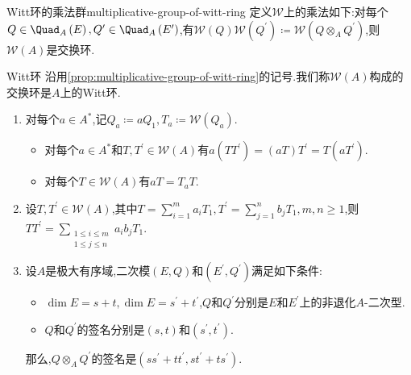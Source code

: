\begin{proposition}{Witt环的乘法群}{multiplicative-group-of-witt-ring}
	定义$\mathcal{W}$上的乘法如下:对每个$Q\in\Quad_{A}\left(E\right),Q^{\prime}\in\Quad_{A}\left(E^{\prime}\right)$,有$\mathcal{W}\left(Q\right)\mathcal{W}\left(Q^{\prime}\right)\coloneq\mathcal{W}\left(Q\otimes_{A}Q^{\prime}\right)$,则$\mathcal{W}\left(A\right)$是交换环.
\end{proposition}

\begin{definition}{Witt环}{}
	沿用\cref{prop:multiplicative-group-of-witt-ring}的记号.我们称$\mathcal{W}\left(A\right)$构成的交换环是$A$上的Witt环.
\end{definition}

\begin{remark}{}{}
	\begin{enumerate}
		\item 对每个$a\in A^{\ast}$,记$Q_{a}\coloneq aQ_{1},T_{a}\coloneq\mathcal{W}\left(Q_{a}\right)$.
		\begin{itemize}
			\item 对每个$a\in A^{\ast}$和$T,T^{\prime}\in\mathcal{W}\left(A\right)$有$a\left(TT^{\prime}\right)=\left(aT\right)T^{\prime}=T\left(aT^{\prime}\right)$.
			\item 对每个$T\in\mathcal{W}\left(A\right)$有$aT=T_{a}T$.
		\end{itemize}
		\item 设$T,T^{\prime}\in\mathcal{W}\left(A\right)$,其中$T=\sum\limits_{i=1}^{m}a_{i}T_{1},T^{\prime}=\sum\limits_{j=1}^{n}b_{j}T_{1},m,n\geq 1$,则$TT^{\prime}=\sum\limits_{\substack{1\leq i\leq m\\1\leq j\leq n}}a_{i}b_{j}T_{1}$.
		\item 设$A$是极大有序域,二次模$\left(E,Q\right)$和$\left(E^{\prime},Q^{\prime}\right)$满足如下条件:
		\begin{itemize}
			\item $\dim E=s+t,\dim E=s^{\prime}+t^{\prime}$,$Q$和$Q^{\prime}$分别是$E$和$E^{\prime}$上的非退化$A$-二次型.
			\item $Q$和$Q^{\prime}$的签名分别是$\left(s,t\right)$和$\left(s^{\prime},t^{\prime}\right)$.
		\end{itemize}
		那么,$Q\otimes_{A}Q^{\prime}$的签名是$\left(ss^{\prime}+tt^{\prime},st^{\prime}+ts^{\prime}\right)$.
	\end{enumerate}
\end{remark}






























